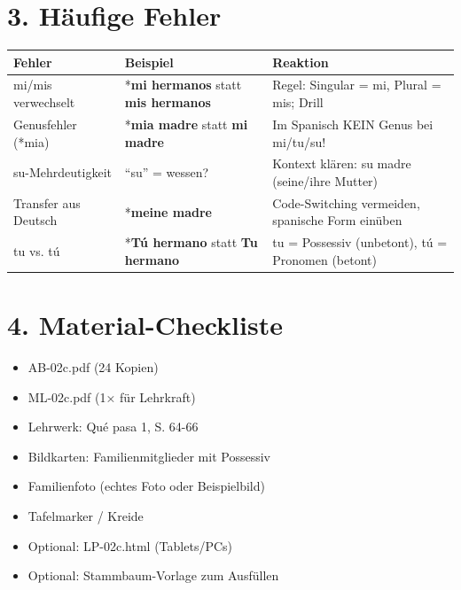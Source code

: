 \documentclass[11pt, a4paper]{article}
\newcommand{\fachfarbe}{spanisch}
\newcommand{\sequenz}{02}
\newcommand{\block}{c}
\newcommand{\lerngruppengroesse}{24}
\newcommand{\es}[1]{\textcolor{\fachfarbe}{\textbf{#1}}}
\begin{document}
\section*{3. Häufige Fehler}

\begin{fehlerbox}
\begin{tabularx}{\textwidth}{|l|X|X|}
\hline
\textbf{Fehler} & \textbf{Beispiel} & \textbf{Reaktion} \\
\hline
mi/mis verwechselt & *\es{mi hermanos} statt \es{mis hermanos} & Regel: Singular = mi, Plural = mis; Drill \\
\hline
Genusfehler (*mia) & *\es{mia madre} statt \es{mi madre} & Im Spanisch KEIN Genus bei mi/tu/su! \\
\hline
su-Mehrdeutigkeit & ``su'' = wessen? & Kontext klären: su madre (seine/ihre Mutter) \\
\hline
Transfer aus Deutsch & *\es{meine madre} & Code-Switching vermeiden, spanische Form einüben \\
\hline
tu vs. tú & *\es{Tú hermano} statt \es{Tu hermano} & tu = Possessiv (unbetont), tú = Pronomen (betont) \\
\hline
\end{tabularx}
\end{fehlerbox}


\section*{4. Material-Checkliste}

\begin{materialbox}
\begin{itemize}[label=$\square$]
    \item AB-\sequenz\block.pdf (\lerngruppengroesse{} Kopien)
    \item ML-\sequenz\block.pdf (1× für Lehrkraft)
    \item Lehrwerk: Qué pasa 1, S. 64-66
    \item Bildkarten: Familienmitglieder mit Possessiv
    \item Familienfoto (echtes Foto oder Beispielbild)
    \item Tafelmarker / Kreide
    \item Optional: LP-\sequenz\block.html (Tablets/PCs)
    \item Optional: Stammbaum-Vorlage zum Ausfüllen
\end{itemize}
\end{materialbox}
\end{document}
